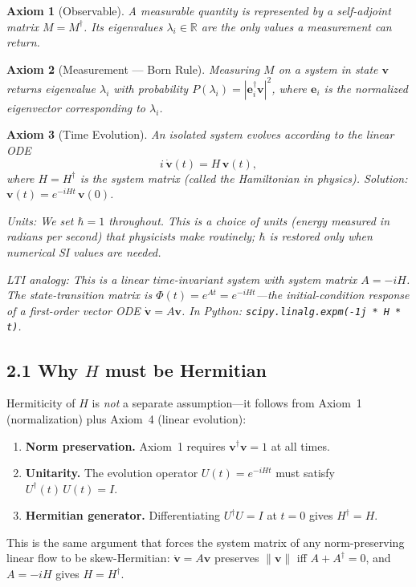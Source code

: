 \documentclass[12pt,a4paper]{article}
\newtheorem{axiom}{Axiom}
\begin{document}
\begin{axiom}[Observable]
A measurable quantity is represented by a self-adjoint matrix $M = M^\dagger$.  Its eigenvalues $\lambda_i \in \mathbb{R}$ are the only values a measurement can return.
\end{axiom}

\begin{axiom}[Measurement --- Born Rule]
Measuring $M$ on a system in state $\mathbf{v}$ returns eigenvalue $\lambda_i$ with probability $P(\lambda_i) = |\mathbf{e}_i^\dagger\mathbf{v}|^2$, where $\mathbf{e}_i$ is the normalized eigenvector corresponding to $\lambda_i$.
\end{axiom}

\begin{axiom}[Time Evolution]
An isolated system evolves according to the linear ODE
\[
    i\,\dot{\mathbf{v}}(t) = H\,\mathbf{v}(t),
\]
where $H = H^\dagger$ is the system matrix (called the Hamiltonian in physics).  Solution: $\mathbf{v}(t) = e^{-iHt}\,\mathbf{v}(0)$.

\medskip
\noindent\textit{Units:} We set $\hbar = 1$ throughout.  This is a choice of units (energy measured in radians per second) that physicists make routinely; $\hbar$ is restored only when numerical SI values are needed.

\medskip
\noindent\textit{LTI analogy:} This is a linear time-invariant system with system matrix $A = -iH$.  The state-transition matrix is $\Phi(t) = e^{At} = e^{-iHt}$---the initial-condition response of a first-order vector ODE $\dot{\mathbf{v}} = A\mathbf{v}$.  In Python: \texttt{scipy.linalg.expm(-1j * H * t)}.
\end{axiom}

\subsection{2.1 Why $H$ must be Hermitian}

Hermiticity of $H$ is \emph{not} a separate assumption---it follows from Axiom~1 (normalization) plus Axiom~4 (linear evolution):
\begin{enumerate}[nosep]
    \item \textbf{Norm preservation.}  Axiom~1 requires $\mathbf{v}^\dagger\mathbf{v} = 1$ at all times.
    \item \textbf{Unitarity.}  The evolution operator $U(t) = e^{-iHt}$ must satisfy $U^\dagger(t)\,U(t) = I$.
    \item \textbf{Hermitian generator.}  Differentiating $U^\dagger U = I$ at $t = 0$ gives $H^\dagger = H$.
\end{enumerate}
This is the same argument that forces the system matrix of any norm-preserving linear flow to be skew-Hermitian: $\dot{\mathbf{v}} = A\mathbf{v}$ preserves $\|\mathbf{v}\|$ iff $A + A^\dagger = 0$, and $A = -iH$ gives $H = H^\dagger$.
\end{document}
